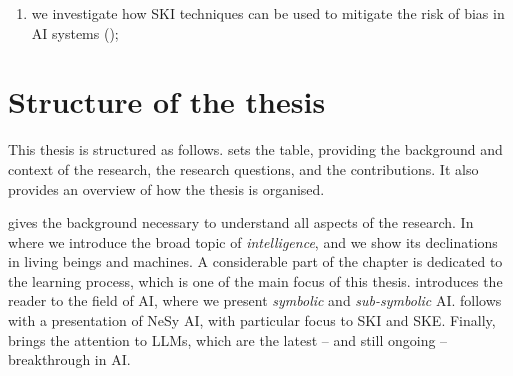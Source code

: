\begin{refsection}
\begin{enumerate}[label=\emph{(\roman*)}]
    \begin{enumerate}[label=\emph{(\arabic*)},resume]
        \item we investigate how \ac{SKI} techniques can be used to mitigate the risk of bias in \ac{AI} systems ();
    \end{enumerate}
\end{enumerate}


\section{Structure of the thesis}
\label{sec:structure-of-the-thesis}
%
This thesis is structured as follows.
%
 sets the table, providing the background and context of the research, the research questions, and the contributions.
%
It also provides an overview of how the thesis is organised.


 gives the background necessary to understand all aspects of the research.
%
In  where we introduce the broad topic of \emph{intelligence}, and we show its declinations in living beings and machines.
%
A considerable part of the chapter is dedicated to the learning process, which is one of the main focus of this thesis.
%
 introduces the reader to the field of \ac{AI}, where we present \emph{symbolic} and \emph{sub-symbolic} \ac{AI}.
%
 follows with a presentation of \ac{NeSy} \ac{AI}, with particular focus to \ac{SKI} and \ac{SKE}.
%
Finally,  brings the attention to \acp{LLM}, which are the latest -- and still ongoing -- breakthrough in \ac{AI}.


\printbibliography[title=Reference,heading=bibintoc]

\end{refsection}